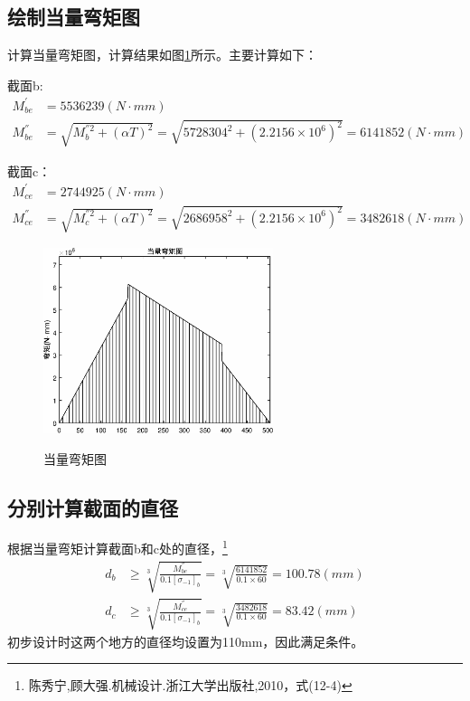 	\subsection{绘制当量弯矩图}
	计算当量弯矩图，计算结果如图\ref{wan-d}所示。主要计算如下：
	
		截面b:
			\begin{align}
				M^{′}_{be} &=5536239(N\cdot mm)\\
				M^{″}_{be} &=\sqrt{M^{″2}_{b}+(\alpha T)^2}=\sqrt{5728304^2 +(2.2156\times 10^6)^2}=6141852(N\cdot mm)
			\end{align}
			
		截面c：
			\begin{align}
				M^{′}_{ce} &=2744925(N\cdot mm)\\
				M^{″}_{ce} &=\sqrt{M^{″2}_{c}+(\alpha T)^2}=\sqrt{2686958^2 +(2.2156\times 10^6)^2}=3482618(N\cdot mm)
			\end{align}

	\begin{figure}[H]
		\centering
		\includegraphics[width=0.6\textwidth]{./pic/wan_d.eps}\\
		\caption{当量弯矩图}\label{wan-d}
	\end{figure}

	\subsection{分别计算截面的直径}
	根据当量弯矩计算截面b和c处的直径，\footnote{陈秀宁,顾大强.机械设计.浙江大学出版社,2010，式(12-4)}
	\begin{align}
		d_b &\geq \sqrt[3]{\frac{M^{″}_{be}}{0.1[\sigma_{-1}]_b}}=\sqrt[3]{\frac{6141852}{0.1\times 60}}=100.78(mm)\\
		d_c &\geq \sqrt[3]{\frac{M^{″}_{ce}}{0.1[\sigma_{-1}]_b}}=\sqrt[3]{\frac{3482618}{0.1\times 60}}=83.42(mm)
	\end{align}
	初步设计时这两个地方的直径均设置为110mm，因此满足条件。

